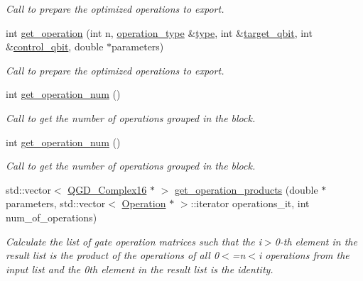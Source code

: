 \begin{DoxyCompactItemize}
\begin{DoxyCompactList}\small\item\em Call to prepare the optimized operations to export. \end{DoxyCompactList}\item 
int \hyperlink{class_decomposition___base_a64e2b692d38fe3ccbd49708d8fa24493}{get\+\_\+operation} (int n, \hyperlink{operations_2include_2_operation_8h_ad99e62941c8e4b13e5fc45ecaaf65eff}{operation\+\_\+type} \&\hyperlink{class_operation_ad47c56c86d62a4c775571e1600416479}{type}, int \&\hyperlink{class_operation_a3e489b72c124b494777c71b1646bb1e9}{target\+\_\+qbit}, int \&\hyperlink{class_operation_a9a798ea8adec5a45fd2ca07996da88e1}{control\+\_\+qbit}, double $\ast$parameters)
\begin{DoxyCompactList}\small\item\em Call to prepare the optimized operations to export. \end{DoxyCompactList}\item 
int \hyperlink{class_operation__block_a27592a2d25c7e74416de2b9d7997efca}{get\+\_\+operation\+\_\+num} ()
\begin{DoxyCompactList}\small\item\em Call to get the number of operations grouped in the block. \end{DoxyCompactList}\item 
int \hyperlink{class_operation__block_a27592a2d25c7e74416de2b9d7997efca}{get\+\_\+operation\+\_\+num} ()
\begin{DoxyCompactList}\small\item\em Call to get the number of operations grouped in the block. \end{DoxyCompactList}\item 
std\+::vector$<$ \hyperlink{struct_q_g_d___complex16}{Q\+G\+D\+\_\+\+Complex16} $\ast$ $>$ \hyperlink{class_decomposition___base_a7e6efc3b157653de20275e234d4df3d9}{get\+\_\+operation\+\_\+products} (double $\ast$parameters, std\+::vector$<$ \hyperlink{class_operation}{Operation} $\ast$ $>$\+::iterator operations\+\_\+it, int num\+\_\+of\+\_\+operations)
\begin{DoxyCompactList}\small\item\em Calculate the list of gate operation matrices such that the i$>$0-\/th element in the result list is the product of the operations of all 0$<$=n$<$i operations from the input list and the 0th element in the result list is the identity. \end{DoxyCompactList}\item 

\end{DoxyCompactItemize}
